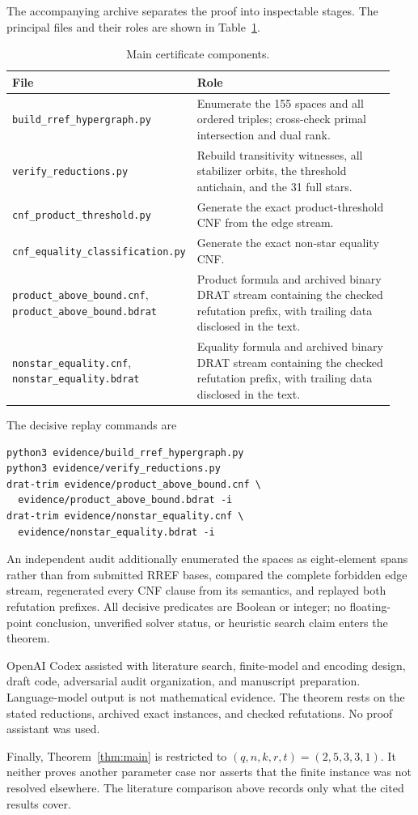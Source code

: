\documentclass[11pt]{article}
\begin{document}
The accompanying archive separates the proof into inspectable stages.  The
principal files and their roles are shown in Table~\ref{tab:files}.

\begin{table}[ht]
\centering
\small
\begin{tabular}{@{}p{0.42\linewidth}p{0.52\linewidth}@{}}
\toprule
File & Role \\
\midrule
\texttt{build\_rref\_hypergraph.py} & Enumerate the 155 spaces and all
ordered triples; cross-check primal intersection and dual rank. \\
\texttt{verify\_reductions.py} & Rebuild transitivity witnesses, all
stabilizer orbits, the threshold antichain, and the 31 full stars. \\
\texttt{cnf\_product\_threshold.py} & Generate the exact product-threshold
CNF from the edge stream. \\
\texttt{cnf\_equality\_classification.py} & Generate the exact non-star
equality CNF. \\
\texttt{product\_above\_bound.cnf},
\texttt{product\_above\_bound.bdrat} & Product formula and archived binary
DRAT stream containing the checked refutation prefix, with trailing data
disclosed in the text. \\
\texttt{nonstar\_equality.cnf},
\texttt{nonstar\_equality.bdrat} & Equality formula and archived binary DRAT
stream containing the checked refutation prefix, with trailing data disclosed
in the text. \\
\bottomrule
\end{tabular}
\caption{Main certificate components.}
\label{tab:files}
\end{table}

The decisive replay commands are
\begin{verbatim}
python3 evidence/build_rref_hypergraph.py
python3 evidence/verify_reductions.py
drat-trim evidence/product_above_bound.cnf \
  evidence/product_above_bound.bdrat -i
drat-trim evidence/nonstar_equality.cnf \
  evidence/nonstar_equality.bdrat -i
\end{verbatim}
An independent audit additionally enumerated the spaces as eight-element
spans rather than from submitted RREF bases, compared the complete forbidden
edge stream, regenerated every CNF clause from its semantics, and replayed
both refutation prefixes.  All decisive predicates are Boolean or integer; no
floating-point conclusion, unverified solver status, or heuristic search
claim enters the theorem.

OpenAI Codex assisted with literature search, finite-model and encoding
design, draft code, adversarial audit organization, and manuscript
preparation.  Language-model output is not mathematical evidence.  The
theorem rests on the stated reductions, archived exact instances, and checked
refutations.  No proof assistant was used.

Finally, Theorem~\ref{thm:main} is restricted to
$(q,n,k,r,t)=(2,5,3,3,1)$.  It neither proves another parameter case nor
asserts that the finite instance was not resolved elsewhere.  The literature
comparison above records only what the cited results cover.



\end{document}
